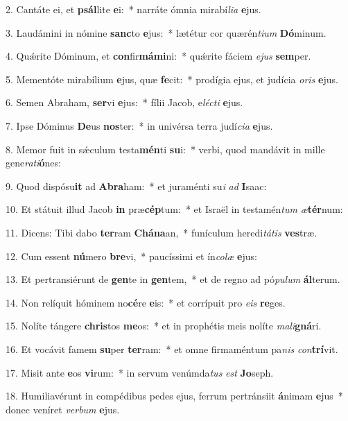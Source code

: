 2. Cantáte ei, et \textbf{psál}lite \textbf{e}i:~*  narráte ómnia mirabí\textit{li}\textit{a} \textbf{e}jus.\

3. Laudámini in nómine \textbf{sanc}to \textbf{e}jus:~*  lætétur cor quærén\textit{ti}\textit{um} \textbf{Dó}minum.\

4. Quǽrite Dóminum, et \textbf{con}fir\textbf{má}\textbf{mi}ni:~*  quǽrite fáciem \textit{e}\textit{jus} \textbf{sem}per.\

5. Mementóte mirabílium \textbf{e}jus, quæ \textbf{fe}cit:~*  prodígia ejus, et judícia \textit{o}\textit{ris} \textbf{e}jus.\

6. Semen Abraham, \textbf{ser}vi \textbf{e}jus:~*  fílii Jacob, e\textit{léc}\textit{ti} \textbf{e}jus.\

7. Ipse Dóminus \textbf{De}us \textbf{nos}ter:~*  in univérsa terra judí\textit{ci}\textit{a} \textbf{e}jus.\

8. Memor fuit in sǽculum testa\textbf{mén}ti \textbf{su}i:~*  verbi, quod mandávit in mille gene\textit{ra}\textit{ti}\textbf{ó}nes:\

9. Quod dispósu\textbf{it} ad \textbf{A}\textbf{bra}ham:~*  et juraménti su\textit{i} \textit{ad} \textbf{I}saac:\

10. Et státuit illud Jacob \textbf{in} præ\textbf{cép}tum:~*  et Israël in testamén\textit{tum} \textit{æ}\textbf{tér}num:\

11. Dicens: Tibi dabo \textbf{ter}ram \textbf{Chá}\textbf{na}an,~*  funículum heredi\textit{tá}\textit{tis} \textbf{ves}træ.\

12. Cum essent \textbf{nú}mero \textbf{bre}vi,~*  paucíssimi et ín\textit{co}\textit{læ} \textbf{e}jus:\

13. Et pertransiérunt de \textbf{gen}te in \textbf{gen}tem,~*  et de regno ad pó\textit{pu}\textit{lum} \textbf{ál}terum.\

14. Non relíquit hóminem no\textbf{cé}re \textbf{e}is:~*  et corrípuit pro \textit{e}\textit{is} \textbf{re}ges.\

15. Nolíte tángere \textbf{chris}tos \textbf{me}os:~*  et in prophétis meis nolíte \textit{ma}\textit{li}\textbf{gná}ri.\

16. Et vocávit famem \textbf{su}per \textbf{ter}ram:~*  et omne firmaméntum pa\textit{nis} \textit{con}\textbf{trí}vit.\

17. Misit ante \textbf{e}os \textbf{vi}rum:~*  in servum venúmda\textit{tus} \textit{est} \textbf{Jo}seph.\

18. Humiliavérunt in compédibus pedes ejus, ferrum pertránsiit \textbf{á}nimam \textbf{e}jus~*  donec veníret \textit{ver}\textit{bum} \textbf{e}jus.\

